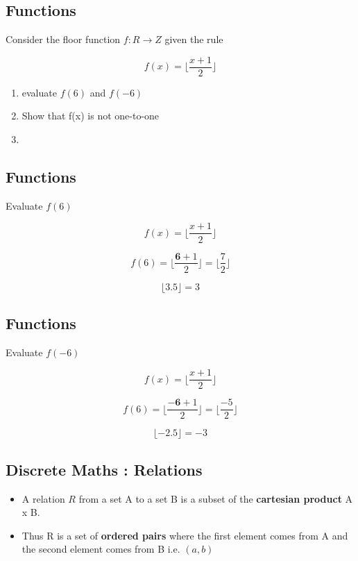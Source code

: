 \documentclass[]{report}
\begin{document}
\subsection{Functions}
Consider the floor function $f : R \rightarrow Z$ given the rule

\[ f(x) = \lfloor \frac{x+1}{2} \rfloor \]

\begin{enumerate}
\item evaluate $f(6)$ and $f(-6)$
\item Show that f(x) is not one-to-one
\item 
\end{enumerate}


\subsection{Functions}
Evaluate $f(6)$ 


\[ f(x) = \lfloor \frac{x+1}{2} \rfloor \]


\[ f(6) = \lfloor \frac{\boldsymbol{6}+1}{2}\rfloor = \lfloor  \frac{7}{2}\rfloor\]


\[  \lfloor 3.5 \rfloor  = 3  \]



\subsection{Functions}
Evaluate $f(-6)$ 


\[ f(x) = \lfloor \frac{x+1}{2} \rfloor \]


\[ f(6) = \lfloor \frac{\boldsymbol{-6}+1}{2}\rfloor = \lfloor  \frac{-5}{2}\rfloor\]


\[  \lfloor -2.5 \rfloor  = -3  \]








\subsection{Discrete Maths : Relations}

\begin{itemize}
\item A relation $R$ from a set A to a set B is a subset of the
\textbf{cartesian product} A x B. 
\item Thus R is a set of \textbf{ordered pairs} where
the first element comes from A and the second element comes
from B i.e. $(a, b)$
\end{itemize}
\end{document}
